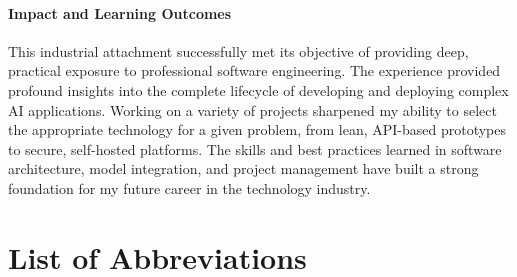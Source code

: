 \documentclass[12pt,a4paper]{article}
\begin{document}
\paragraph{Impact and Learning Outcomes} This industrial attachment successfully met its objective of providing deep, practical exposure to professional software engineering. The experience provided profound insights into the complete lifecycle of developing and deploying complex AI applications. Working on a variety of projects sharpened my ability to select the appropriate technology for a given problem, from lean, API-based prototypes to secure, self-hosted platforms. The skills and best practices learned in software architecture, model integration, and project management have built a strong foundation for my future career in the technology industry.

\newpage
\newpage
{} %
\tableofcontents

\newpage
{} %
\listoffigures


\newpage
{} %
\section*{List of Abbreviations}
\label{sec:abbreviations}
\end{document}
